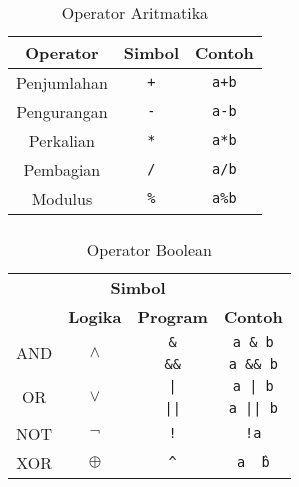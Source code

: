\documentclass[aspectratio=169]{beamer}
\theoremstyle{definition}
\begin{document}
    \begin{frame}
        \frametitle{\insertsection}
        \begin{table}
            \centering
            \begin{tabular}{|c|c|c|}
                \hline
                \rowcolor{HIMAmuda}
                \textbf{Operator} & \textbf{Simbol} & \textbf{Contoh}\\
                \hline
                Penjumlahan & \texttt{+} & \texttt{a+b}\\
                Pengurangan & \texttt{-} & \texttt{a-b}\\
                Perkalian & \texttt{*} & \texttt{a*b}\\
                Pembagian & \texttt{/} & \texttt{a/b}\\
                Modulus & \texttt{\%} & \texttt{a\%b}\\
                \hline
            \end{tabular}
            \caption{Operator Aritmatika}
        \end{table}
    \end{frame}

    \begin{frame}
        \frametitle{\insertsection}
        \begin{table}
            \centering
            \begin{tabular}{|c|c|c|c|}
                \hline
                \rowcolor{HIMAmuda}
                & \multicolumn{2}{c|}{\textbf{Simbol}} & \\
                \cline{2-3}
                \rowcolor{HIMAmuda}
                \multirow{-2}{*}{\textbf{Operator}}& \textbf{Logika} & \textbf{Program} &\multirow{-2}{*}{\textbf{Contoh}} \\
                \hline
                \multirow{2}{*}{AND}& \multirow{2}{*}{$\land$} & \texttt{\&}& \texttt{a \& b}\\
                & & \texttt{\&\&}& \texttt{a \&\& b}\\
                \multirow{2}{*}{OR} & \multirow{2}{*}{$\lor$} & \texttt{|} & \texttt{a | b}\\
                & & \texttt{||} & \texttt{a || b}\\
                NOT & $\lnot$ & \texttt{!} & \texttt{!a}\\
                XOR & $\oplus$ & \texttt{\^} & \texttt{a \^\,b}\\
                \hline
            \end{tabular}
            \caption{Operator Boolean}
        \end{table}
    \end{frame}
\end{document}
